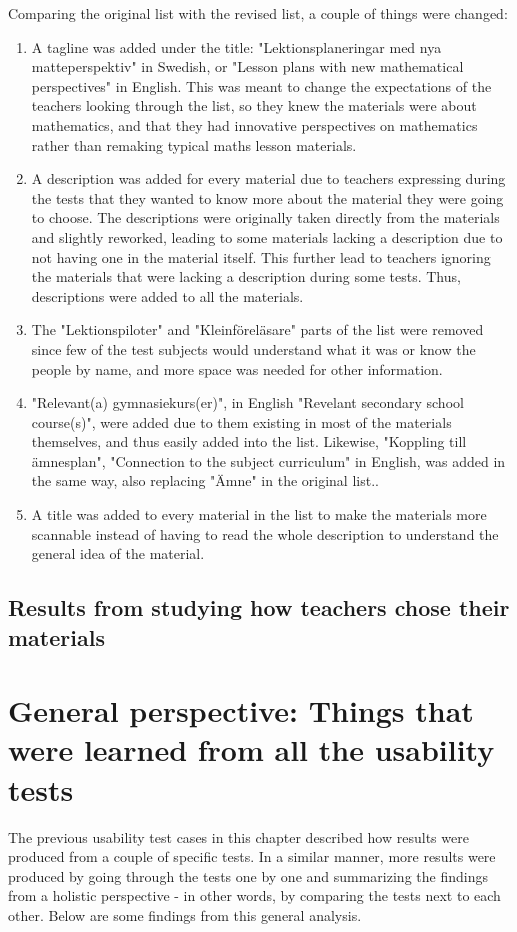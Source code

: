 Comparing the original list with the revised list, a couple of things were changed:
\begin{enumerate}
	\item A tagline was added under the title: "Lektionsplaneringar med nya matteperspektiv" in Swedish, or "Lesson plans with new mathematical perspectives" in English. This was meant to change the expectations of the teachers looking through the list, so they knew the materials were about mathematics, and that they had innovative perspectives on mathematics rather than remaking typical maths lesson materials.
	\item A description was added for every material due to teachers expressing during the tests that they wanted to know more about the material they were going to choose. The descriptions were originally taken directly from the materials and slightly reworked, leading to some materials lacking a description due to not having one in the material itself. This further lead to teachers ignoring the materials that were lacking a description during some tests. Thus, descriptions were added to all the materials.
	\item The "Lektionspiloter" and "Kleinföreläsare" parts of the list were removed since few of the test subjects would understand what it was or know the people by name, and more space was needed for other information.
	\item "Relevant(a) gymnasiekurs(er)", in English "Revelant secondary school course(s)", were added due to them existing in most of the materials themselves, and thus easily added into the list. Likewise, "Koppling till ämnesplan", "Connection to the subject curriculum" in English, was added in the same way, also replacing "Ämne" in the original list..
	\item A title was added to every material in the list to make the materials more scannable instead of having to read the whole description to understand the general idea of the material.
\end{enumerate}

\subsection{Results from studying how teachers chose their materials}



\section{General perspective: Things that were learned from all the usability tests}
The previous usability test cases in this chapter described how results were produced from a couple of specific tests. In a similar manner, more results were produced by going through the tests one by one and summarizing the findings from a holistic perspective - in other words, by comparing the tests next to each other. Below are some findings from this general analysis.

